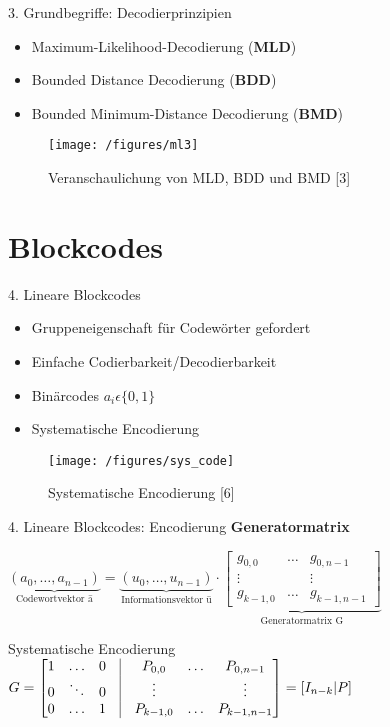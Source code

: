 \documentclass[ngerman]{beamer}
\begin{document}
\begin{frame}{3. Grundbegriffe: Decodierprinzipien}
\begin{itemize}


	\item Maximum-Likelihood-Decodierung (\textbf{MLD})
	\item Bounded Distance Decodierung (\textbf{BDD})
	\item Bounded Minimum-Distance Decodierung (\textbf{BMD})
 \end{itemize}
	\begin{figure}[htbp]
 		\texttt{[image: /figures/ml3]}
 			\caption{Veranschaulichung von MLD, BDD und BMD [3]}
	\end{figure}
\end{frame}


\section{Blockcodes}
\begin{frame}{4. Lineare Blockcodes}

	\begin{itemize}
		\item Gruppeneigenschaft für Codewörter gefordert
		\item Einfache Codierbarkeit/Decodierbarkeit\newline
		\item \alert{Binärcodes} $ a_{i} \epsilon \{0,1\}$
		\item Systematische Encodierung
	\end{itemize}
	\begin{figure}[htbp]
 		\texttt{[image: /figures/sys\_code]}
 			\caption{Systematische Encodierung [6]}
	\end{figure}
\end{frame}




\begin{frame}{4. Lineare Blockcodes: Encodierung}
	\textbf{Generatormatrix}

$ \underbrace{(a_{0},\dots,a_{n-1})}_\text{Codewortvektor \={a}} = \underbrace{(u_{0},\dots,u_{n-1})}_\text{Informationsvektor \={u}} \cdot
\underbrace{\begin{bmatrix}
g_{0,0}	& \dots	 & g_{0,n-1}      \\
\vdots	&    & \vdots	  \\
g_{k-1,0} 	& \dots 	 & g_{k-1,n-1}
\end{bmatrix}}_\text{Generatormatrix G}
$

\alert{Systematische Encodierung}
$
G =
\begin{bmatrix}
1 & \dots & 0  & \vrule & P_{0,0} &  \dots &P_{0,n-1}\\
0 & \ddots & 0 & \vrule & \vdots & & \vdots \\
0 & \dots & 1  & \vrule & P_{k-1,0} & \dots &P_{k-1,n-1}
\end{bmatrix}
= [ I_{n-k} | P]
$
\end{frame}
\end{document}
